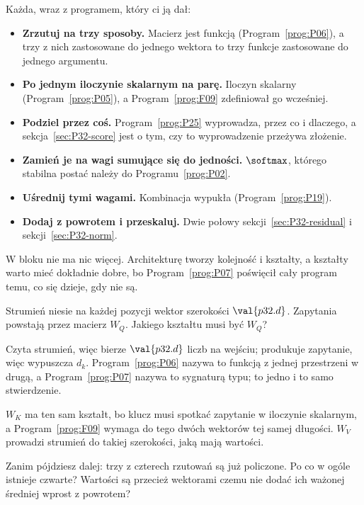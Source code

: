\begin{fr}

Każda, wraz z programem, który ci ją dał:

\begin{itemize}
\item \textbf{Zrzutuj na trzy sposoby.} Macierz jest funkcją
  (Program~\ref{prog:P06}), a trzy z nich zastosowane do jednego wektora to
  trzy funkcje zastosowane do jednego argumentu.
\item \textbf{Po jednym iloczynie skalarnym na parę.} Iloczyn skalarny
  (Program~\ref{prog:P05}), a Program~\ref{prog:F09} zdefiniował go
  wcześniej.
\item \textbf{Podziel przez coś.} Program~\ref{prog:P25} wyprowadza, przez co
  i dlaczego, a sekcja~\ref{sec:P32-score} jest o tym, czy to wyprowadzenie
  przeżywa złożenie.
\item \textbf{Zamień je na wagi sumujące się do jedności.} $\softmax$,
  którego stabilna postać należy do Programu~\ref{prog:P02}.
\item \textbf{Uśrednij tymi wagami.} Kombinacja wypukła
  (Program~\ref{prog:P19}).
\item \textbf{Dodaj z powrotem i przeskaluj.} Dwie połowy
  sekcji~\ref{sec:P32-residual} i sekcji~\ref{sec:P32-norm}.
\end{itemize}

W bloku nie ma nic więcej. Architekturę tworzy kolejność i kształty, a
kształty warto mieć dokładnie dobre, bo Program~\ref{prog:P07} poświęcił cały
program temu, co się dzieje, gdy nie są.

Strumień niesie na każdej pozycji wektor szerokości $\val{p32.d}$. Zapytania
powstają przez macierz $W_Q$. Jakiego kształtu musi być $W_Q$?
\dotline
\nextframe
\end{fr}

\begin{fr}

Czyta strumień, więc bierze $\val{p32.d}$ liczb na wejściu; produkuje
zapytanie, więc wypuszcza $d_k$. Program~\ref{prog:P06} nazywa to funkcją z
jednej przestrzeni w drugą, a Program~\ref{prog:P07} nazywa to sygnaturą
typu; to jedno i to samo stwierdzenie.

$W_K$ ma ten sam kształt, bo klucz musi spotkać zapytanie w iloczynie
skalarnym, a Program~\ref{prog:F09} wymaga do tego dwóch wektorów tej samej
długości. $W_V$ prowadzi strumień do takiej szerokości, jaką mają wartości.

Zanim pójdziesz dalej: trzy z czterech rzutowań są już policzone. Po co w
ogóle istnieje czwarte? Wartości są przecież wektorami \dash{} czemu nie
dodać ich ważonej średniej wprost z powrotem?
\dotline
\nextframe
\end{fr}

